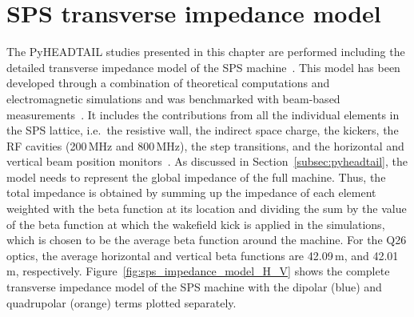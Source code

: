 \section{SPS transverse impedance model}\label{sec:sps_impedance_model}
The PyHEADTAIL studies presented in this chapter are performed including the detailed transverse impedance model of the SPS machine~\cite{sps_impedance_model_git}. This model has been developed through a combination of theoretical computations and electromagnetic simulations and was benchmarked with beam-based measurements~\cite{Salvant:1274254, Zannini:1561199, Salvant:1271349, Zannini:2141779}. 
It includes the contributions from all the individual elements in the SPS lattice, i.e.~the resistive wall, the indirect space charge, the kickers, the RF cavities (200\,MHz and 800\,MHz), the step transitions, and the horizontal and vertical beam position monitors~\cite{Zannini:2141779}. As discussed in  Section~\ref{subsec:pyheadtail}, the model needs to represent the global impedance of the full machine. Thus, the total impedance is obtained by summing up the impedance of each element weighted with the beta function at its location and dividing the sum by the value of the beta function at which the wakefield kick is applied in the simulations, which is chosen to be the average beta function around the machine. For the Q26 optics, the average horizontal and vertical beta functions are 42.09\,m, and 42.01\,m, respectively.
Figure~\ref{fig:sps_impedance_model_H_V} shows the complete transverse impedance model of the SPS machine with the dipolar (blue) and quadrupolar (orange) terms plotted separately. 

